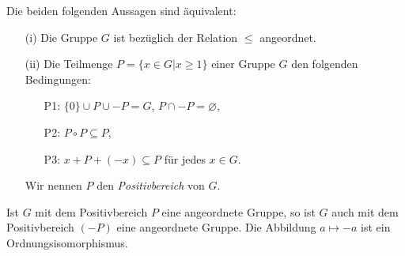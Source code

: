 %
\begin{bem}\label{afG} %
%
Die beiden folgenden Aussagen sind äquivalent:
\begin{enumerate}
\item[(i)] Die Gruppe $G$ ist bezüglich der Relation $\leq$ angeordnet.
\item[(ii)] Die Teilmenge $P = \lbrace x \in G | x \geq 1\rbrace$ einer Gruppe $G$ den folgenden Bedingungen:
\begin{enumerate}
\item[P1:] $\lbrace0\rbrace \cup P\cup -P = G$, $P \cap -P = \varnothing$,
\item[P2:] $P \circ P \subseteq P$,
\item[P3:] $x+P+(-x) \subseteq P$ für jedes $x \in G$.
\end{enumerate}
Wir nennen $P$ den \textit{Positivbereich} von $G$.
\end{enumerate}

%
\end{bem}
%
%
%
\begin{bsp}
Ist $G$ mit dem Positivbereich $P$ eine angeordnete Gruppe, so ist $G$ auch mit dem Positivbereich $(-P)$ eine angeordnete Gruppe. Die Abbildung $a \mapsto -a$ ist ein Ordnungsisomorphismus.
\end{bsp}
%

